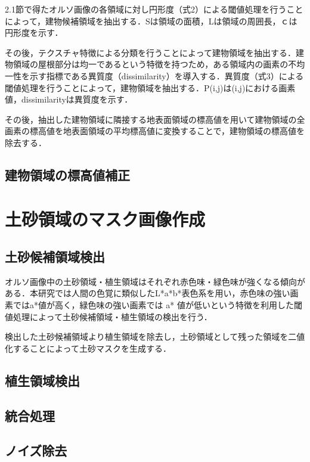       2.1節で得たオルソ画像の各領域に対し円形度（式2）による閾値処理を行うことによって，建物候補領域を抽出する．Sは領域の面積，Lは領域の周囲長，ｃは円形度を示す．
    
      その後，テクスチャ特徴による分類を行うことによって建物領域を抽出する．建物領域の屋根部分は均一であるという特徴を持つため，ある領域内の画素の不均一性を示す指標である異質度（dissimilarity）\cite{論文手法3}を導入する．異質度（式3）による閾値処理を行うことによって，建物領域を抽出する．P(i,j)は(i,j)における画素値，dissimilarityは異質度を示す．

      その後，抽出した建物領域に隣接する地表面領域の標高値を用いて建物領域の全画素の標高値を地表面領域の平均標高値に変換することで，建物領域の標高値を除去する．

    \subsection{建物領域の標高値補正}

  
  \section{土砂領域のマスク画像作成}
    \subsection{土砂候補領域検出}
      オルソ画像中の土砂領域・植生領域はそれぞれ赤色味・緑色味が強くなる傾向がある．本研究では人間の色覚に類似したL*a*b*表色系を用い，赤色味の強い画素ではa*値が高く，緑色味の強い画素では a* 値が低いという特徴を利用した閾値処理によって土砂候補領域・植生領域の検出を行う．
      
      検出した土砂候補領域より植生領域を除去し，土砂領域として残った領域を二値化することによって土砂マスクを生成する．
  
    \subsection{植生領域検出}
    \subsection{統合処理}
    \subsection{ノイズ除去}


